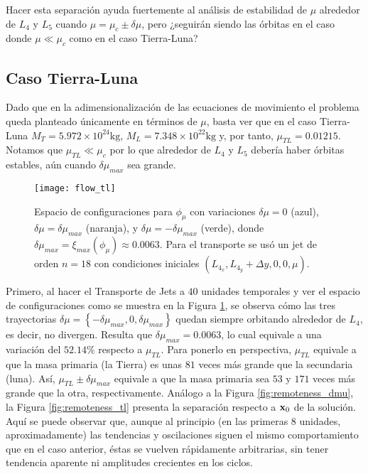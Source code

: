 Hacer esta separación ayuda fuertemente al análisis de estabilidad de $\mu$ alrededor de $L_4$ y $L_5$ cuando $\mu = \mu_c \pm \delta\mu$, pero ¿seguirán siendo las órbitas en el caso donde $\mu \ll \mu_c$ como en el caso Tierra-Luna?

\subsection{Caso Tierra-Luna}
Dado que en la adimensionalización de las ecuaciones de movimiento el problema queda planteado únicamente en términos de $\mu$, basta ver que en el caso Tierra-Luna $M_T = 5.972 \times 10^{24} \textrm{kg} $, $M_L = 7.348 \times 10^{22} \textrm{kg}$ y, por tanto, $\mu_{TL} = 0.01215$. Notamos que $\mu_{TL} \ll \mu_c$ por lo que alrededor de $L_4$ y $L_5$ debería haber órbitas estables, aún cuando $\delta\mu_{max}$ sea grande.

\begin{figure}
 \centering
 \texttt{[image: flow\_tl]}
 \caption{Espacio de configuraciones para $\phi_\mu$ con variaciones $\delta\mu = 0$ (azul), $\delta\mu = \delta\mu_{max}$ (naranja), y $\delta\mu = -\delta\mu_{max}$ (verde), donde $\delta\mu_{max} = \xi_{max}(\phi_\mu) \approx 0.0063$. Para el transporte se usó un jet de orden $n=18$ con condiciones iniciales $\left( L_{4_x}, L_{4_y} + \Delta y, 0, 0, \mu \right)$.}
 \label{fig:flow_tl}
\end{figure}

Primero, al hacer el Transporte de Jets a $40$ unidades temporales y ver el espacio de configuraciones como se muestra en la Figura \ref{fig:flow_tl}, se observa cómo las tres trayectorias $\delta\mu = \left\lbrace -\delta\mu_{max}, 0, \delta\mu_{max} \right\rbrace$ quedan siempre orbitando alrededor de $L_4$, es decir, no divergen. Resulta que $\delta\mu_{max} = 0.0063 $, lo cual equivale a una variación del $52.14 \%$ respecto a $\mu_{TL}$. Para ponerlo en perspectiva, $\mu_{TL}$ equivale a que la masa primaria (la Tierra) es unas $81$ veces más grande que la secundaria (luna). Así, $\mu_{TL} \pm \delta\mu_{max}$ equivale a que la masa primaria sea $53$ y $171$ veces más grande que la otra, respectivamente. Análogo a la Figura \ref{fig:remoteness_dmu}, la Figura \ref{fig:remoteness_tl} presenta la separación respecto a $\mathbf{x}_0$ de la solución. Aquí se puede observar que, aunque al principio (en las primeras $8$ unidades, aproximadamente) las tendencias y oscilaciones siguen el mismo comportamiento que en el caso anterior, éstas se vuelven rápidamente  arbitrarias, sin tener tendencia aparente ni amplitudes crecientes en los ciclos.

